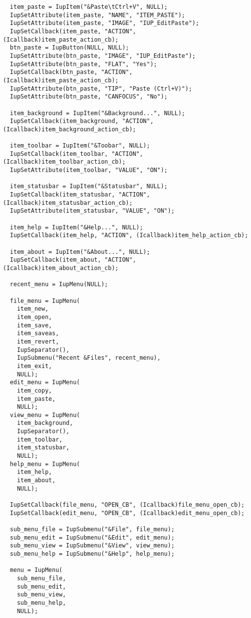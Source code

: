 \documentclass{ctexart}
\begin{document}
\begin{lstlisting}
  item_paste = IupItem("&Paste\tCtrl+V", NULL);
  IupSetAttribute(item_paste, "NAME", "ITEM_PASTE");
  IupSetAttribute(item_paste, "IMAGE", "IUP_EditPaste");
  IupSetCallback(item_paste, "ACTION", (Icallback)item_paste_action_cb);
  btn_paste = IupButton(NULL, NULL);
  IupSetAttribute(btn_paste, "IMAGE", "IUP_EditPaste");
  IupSetAttribute(btn_paste, "FLAT", "Yes");
  IupSetCallback(btn_paste, "ACTION", (Icallback)item_paste_action_cb);
  IupSetAttribute(btn_paste, "TIP", "Paste (Ctrl+V)");
  IupSetAttribute(btn_paste, "CANFOCUS", "No");

  item_background = IupItem("&Background...", NULL);
  IupSetCallback(item_background, "ACTION", (Icallback)item_background_action_cb);

  item_toolbar = IupItem("&Toobar", NULL);
  IupSetCallback(item_toolbar, "ACTION", (Icallback)item_toolbar_action_cb);
  IupSetAttribute(item_toolbar, "VALUE", "ON");

  item_statusbar = IupItem("&Statusbar", NULL);
  IupSetCallback(item_statusbar, "ACTION", (Icallback)item_statusbar_action_cb);
  IupSetAttribute(item_statusbar, "VALUE", "ON");

  item_help = IupItem("&Help...", NULL);
  IupSetCallback(item_help, "ACTION", (Icallback)item_help_action_cb);

  item_about = IupItem("&About...", NULL);
  IupSetCallback(item_about, "ACTION", (Icallback)item_about_action_cb);

  recent_menu = IupMenu(NULL);

  file_menu = IupMenu(
    item_new,
    item_open,
    item_save,
    item_saveas,
    item_revert,
    IupSeparator(),
    IupSubmenu("Recent &Files", recent_menu),
    item_exit,
    NULL);
  edit_menu = IupMenu(
    item_copy,
    item_paste,
    NULL);
  view_menu = IupMenu(
    item_background,
    IupSeparator(),
    item_toolbar,
    item_statusbar,
    NULL);
  help_menu = IupMenu(
    item_help,
    item_about,
    NULL);

  IupSetCallback(file_menu, "OPEN_CB", (Icallback)file_menu_open_cb);
  IupSetCallback(edit_menu, "OPEN_CB", (Icallback)edit_menu_open_cb);

  sub_menu_file = IupSubmenu("&File", file_menu);
  sub_menu_edit = IupSubmenu("&Edit", edit_menu);
  sub_menu_view = IupSubmenu("&View", view_menu);
  sub_menu_help = IupSubmenu("&Help", help_menu);

  menu = IupMenu(
    sub_menu_file,
    sub_menu_edit,
    sub_menu_view,
    sub_menu_help,
    NULL);


\end{lstlisting}
\end{document}

